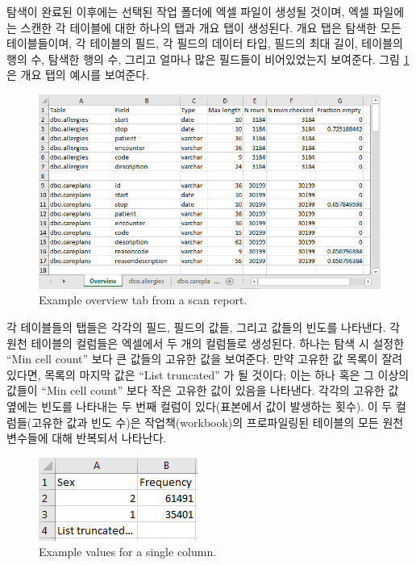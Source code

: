 \documentclass[11pt]{book}
\theoremstyle{definition}
\theoremstyle{definition}
\theoremstyle{definition}
\theoremstyle{remark}
\begin{document}
탐색이 완료된 이후에는 선택된 작업 폴더에 엑셀 파일이 생성될 것이며,
엑셀 파일에는 스캔한 각 테이블에 대한 하나의 탭과 개요 탭이 생성된다.
개요 탭은 탐색한 모든 테이블들이며, 각 테이블의 필드, 각 필드의 데이터
타입, 필드의 최대 길이, 테이블의 행의 수, 탐색한 행의 수, 그리고 얼마나
많은 필드들이 비어있었는지 보여준다. 그림 \ref{fig:ScanOverviewTab}은
개요 탭의 예시를 보여준다.

\begin{figure}

{\centering \includegraphics[width=1\linewidth]{images/ExtractTransformLoad/ScanOverviewTab} 

}

\caption{Example overview tab from a scan report.}\label{fig:ScanOverviewTab}
\end{figure}

각 테이블들의 탭들은 각각의 필드, 필드의 값들, 그리고 값들의 빈도를
나타낸다. 각 원천 테이블의 컬럼들은 엑셀에서 두 개의 컬럼들로 생성된다.
하나는 탐색 시 설정한 ``Min cell count'' 보다 큰 값들의 고유한 값을
보여준다. 만약 고유한 값 목록이 잘려있다면, 목록의 마지막 값은 ``List
truncated'' 가 될 것이다; 이는 하나 혹은 그 이상의 값들이 ``Min cell
count'' 보다 작은 고유한 값이 있음을 나타낸다. 각각의 고유한 값 옆에는
빈도를 나타내는 두 번째 컬럼이 있다(표본에서 값이 발생하는 횟수). 이 두
컬럼들(고유한 값과 빈도 수)은 작업책(workbook)의 프로파일링된 테이블의
모든 원천 변수들에 대해 반복되서 나타난다.

\begin{figure}

{\centering \includegraphics[width=0.3\linewidth]{images/ExtractTransformLoad/ScanSex} 

}

\caption{Example values for a single column.}\label{fig:scanSex}
\end{figure}
\end{document}
